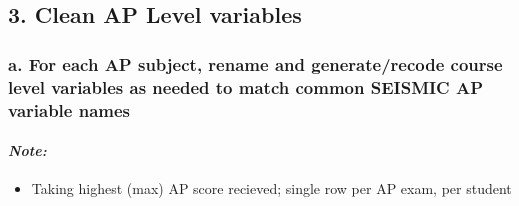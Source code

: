 \documentclass[]{article}
\providecommand{\tightlist}{%
  \setlength{\itemsep}{0pt}\setlength{\parskip}{0pt}}
\let\oldparagraph\paragraph
\renewcommand{\paragraph}[1]{\oldparagraph{#1}\mbox{}}
\begin{document}
\subsection{3. Clean AP Level variables}\label{clean-ap-level-variables}

\subsubsection{a. For each AP subject, rename and generate/recode course
level variables as needed to match common SEISMIC AP variable
names}\label{a.-for-each-ap-subject-rename-and-generaterecode-course-level-variables-as-needed-to-match-common-seismic-ap-variable-names}

\paragraph{\texorpdfstring{\emph{Note:}}{Note:}}\label{note-4}

\begin{itemize}
\tightlist
\item
  Taking highest (max) AP score recieved; single row per AP exam, per
  student
\end{itemize}
\end{document}
